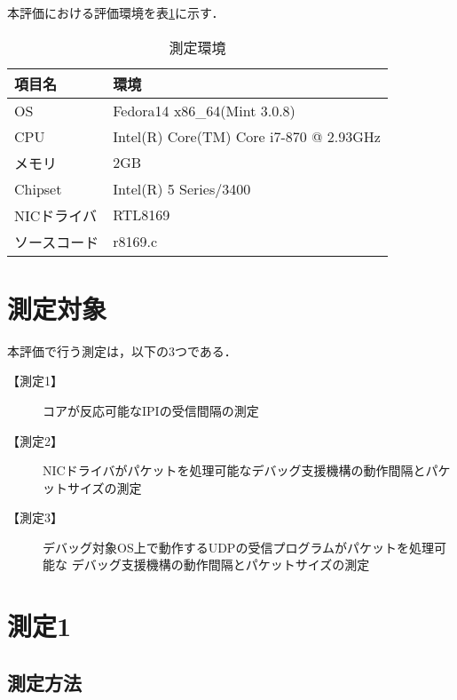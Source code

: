 \documentclass[12pt]{jsarticle}
\begin{document}
本評価における評価環境を表\ref{environment}に示す．

\begin{table}[h]
    \caption{測定環境}
    \label{environment}
    \begin{center}
        \begin{tabular}{l|l}   \hline \hline 
            項目名      & 環境                                    \\ \hline
            OS          & Fedora14 x86\_64(Mint 3.0.8)            \\ 
            CPU         & Intel(R) Core(TM) Core i7-870 @ 2.93GHz \\
            メモリ      & 2GB                                     \\
            Chipset     & Intel(R) 5 Series/3400                  \\
            NICドライバ & RTL8169                                 \\ 
            ソースコード& r8169.c                                 \\ \hline
        \end{tabular}
    \end{center}
\end{table}

\section{測定対象}

本評価で行う測定は，以下の3つである．

\begin{description}
    \item[【測定1】]
        コアが反応可能なIPIの受信間隔の測定
    \item[【測定2】]
        NICドライバがパケットを処理可能なデバッグ支援機構の動作間隔とパケットサイズの測定
    \item[【測定3】]
        デバッグ対象OS上で動作するUDPの受信プログラムがパケットを処理可能な
        デバッグ支援機構の動作間隔とパケットサイズの測定
\end{description}

\section{測定1}

\subsection{測定方法}
\end{document}
